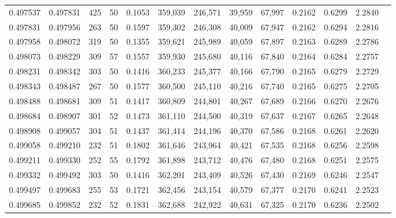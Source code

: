 \begin{tabular}{rrrrrrrrrrrrr}
0.497537 & 0.497831 &   425 &  50 &                                     0.1053 & 359,039 & 246,571 &  39,959 &  67,997 & 0.2162 & 0.6299 & 2.2840 \\
0.497831 & 0.497956 &   263 &  50 &                                     0.1597 & 359,302 & 246,308 &  40,009 &  67,947 & 0.2162 & 0.6294 & 2.2816 \\
0.497958 & 0.498072 &   319 &  50 &                                     0.1355 & 359,621 & 245,989 &  40,059 &  67,897 & 0.2163 & 0.6289 & 2.2786 \\
0.498073 & 0.498229 &   309 &  57 &                                     0.1557 & 359,930 & 245,680 &  40,116 &  67,840 & 0.2164 & 0.6284 & 2.2757 \\
0.498231 & 0.498342 &   303 &  50 &                                     0.1416 & 360,233 & 245,377 &  40,166 &  67,790 & 0.2165 & 0.6279 & 2.2729 \\
0.498343 & 0.498487 &   267 &  50 &                                     0.1577 & 360,500 & 245,110 &  40,216 &  67,740 & 0.2165 & 0.6275 & 2.2705 \\
0.498488 & 0.498681 &   309 &  51 &                                     0.1417 & 360,809 & 244,801 &  40,267 &  67,689 & 0.2166 & 0.6270 & 2.2676 \\
0.498684 & 0.498907 &   301 &  52 &                                     0.1473 & 361,110 & 244,500 &  40,319 &  67,637 & 0.2167 & 0.6265 & 2.2648 \\
0.498908 & 0.499057 &   304 &  51 &                                     0.1437 & 361,414 & 244,196 &  40,370 &  67,586 & 0.2168 & 0.6261 & 2.2620 \\
0.499058 & 0.499210 &   232 &  51 &                                     0.1802 & 361,646 & 243,964 &  40,421 &  67,535 & 0.2168 & 0.6256 & 2.2598 \\
0.499211 & 0.499330 &   252 &  55 &                                     0.1792 & 361,898 & 243,712 &  40,476 &  67,480 & 0.2168 & 0.6251 & 2.2575 \\
0.499332 & 0.499492 &   303 &  50 &                                     0.1416 & 362,201 & 243,409 &  40,526 &  67,430 & 0.2169 & 0.6246 & 2.2547 \\
0.499497 & 0.499683 &   255 &  53 &                                     0.1721 & 362,456 & 243,154 &  40,579 &  67,377 & 0.2170 & 0.6241 & 2.2523 \\
0.499685 & 0.499852 &   232 &  52 &                                     0.1831 & 362,688 & 242,922 &  40,631 &  67,325 & 0.2170 & 0.6236 & 2.2502 \\

\end{tabular}
